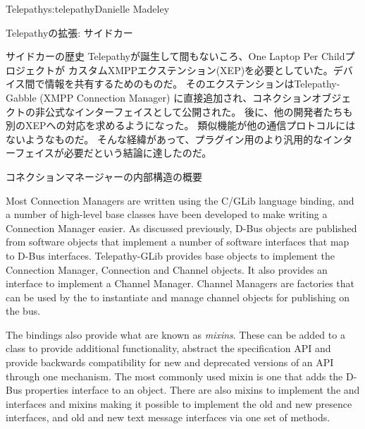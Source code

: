 \begin{aosachapter}{Telepathy}{s:telepathy}{Danielle Madeley}
\begin{aosasect1}{Telepathyの拡張: サイドカー}
\begin{aosabox}{サイドカーの歴史}
Telepathyが誕生して間もないころ、One Laptop Per Childプロジェクトが
カスタムXMPPエクステンション(XEP)を必要としていた。デバイス間で情報を共有するためのものだ。
そのエクステンションはTelepathy-Gabble (XMPP Connection Manager)
に直接追加され、コネクションオブジェクトの非公式なインターフェイスとして公開された。
後に、他の開発者たちも別のXEPへの対応を求めるようになった。
類似機能が他の通信プロトコルにはないようなものだ。
そんな経緯があって、プラグイン用のより汎用的なインターフェイスが必要だという結論に達したのだ。

\end{aosabox}

\end{aosasect1}

\begin{aosasect1}{コネクションマネージャーの内部構造の概要}

Most Connection Managers are written using the C/GLib language
binding, and a number of high-level base classes have been developed
to make writing a Connection Manager easier.  As discussed previously,
D-Bus objects are published from software objects that implement a
number of software interfaces that map to D-Bus
interfaces. Telepathy-GLib provides base objects to implement the
Connection Manager, Connection and Channel objects. It also provides
an interface to implement a Channel Manager. Channel Managers are
factories that can be used by the  to instantiate
and manage channel objects for publishing on the bus.

The bindings also provide what are known as \emph{mixins}.  These can
be added to a class to provide additional functionality, abstract the
specification API and provide backwards compatibility for new and
deprecated versions of an API through one mechanism. The most commonly
used mixin is one that adds the D-Bus properties interface to an
object. There are also mixins to implement the
 and
 interfaces and mixins making it
possible to implement the old and new presence interfaces, and old and
new text message interfaces via one set of methods.


\end{aosasect1}
\end{aosachapter}
